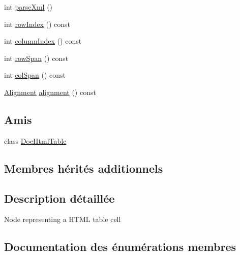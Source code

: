 \begin{DoxyCompactItemize}
\item 
int \hyperlink{class_doc_html_cell_aa5b43dd579348e1e8e4df010176bd928}{parse\+Xml} ()
\item 
int \hyperlink{class_doc_html_cell_aa4c684008ade32fcdb495bbd704a9076}{row\+Index} () const 
\item 
int \hyperlink{class_doc_html_cell_a41c7147ac0961be935af0971f11be512}{column\+Index} () const 
\item 
int \hyperlink{class_doc_html_cell_aa463d34188413d319524346a62134520}{row\+Span} () const 
\item 
int \hyperlink{class_doc_html_cell_a9ca338b39cc12afce3825dad90a3faf1}{col\+Span} () const 
\item 
\hyperlink{class_doc_html_cell_a1bfba233eb785db3496ea2a82d9a2136}{Alignment} \hyperlink{class_doc_html_cell_abacb9832f6ab6f767c0162eb95f758c1}{alignment} () const 
\end{DoxyCompactItemize}
\subsection*{Amis}
\begin{DoxyCompactItemize}
\item 
class \hyperlink{class_doc_html_cell_a1f7413118a8c0d90c891a2695a7cb90d}{Doc\+Html\+Table}
\end{DoxyCompactItemize}
\subsection*{Membres hérités additionnels}


\subsection{Description détaillée}
Node representing a H\+T\+M\+L table cell 

\subsection{Documentation des énumérations membres}
\hypertarget{class_doc_html_cell_a1bfba233eb785db3496ea2a82d9a2136}{}

